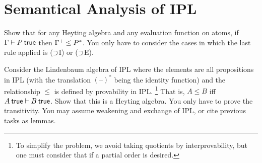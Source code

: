 \documentclass[12pt]{article}
\begin{document}
\section{Semantical Analysis of IPL}

\begin{task}
  Show that for any Heyting algebra and any evaluation function on atoms,
  if $\ctx \entails P \true$ then $\Gamma^+ \leq P^*$.
  You only have to consider the cases in which the last rule applied is ($\supset$I) or ($\supset$E).
\end{task}

\begin{task}
  Consider the Lindenbaum algebra of IPL where
  the elements are all propositions in IPL
  (with the translation $(\text{--})^*$ being the identity function)
  and the relationship $\leq$ is defined by provability in IPL.%
  \footnote{To simplify the problem, we avoid taking quotients by interprovability,
  but one must consider that if a partial order is desired.}
  That is, $A \leq B$ iff $A \true \entails B \true$.
  Show that this is a Heyting algebra.
  You only have to prove the transitivity.
  You may assume weakening and exchange of IPL, or cite previous tasks as lemmas.
\end{task}
\end{document}
